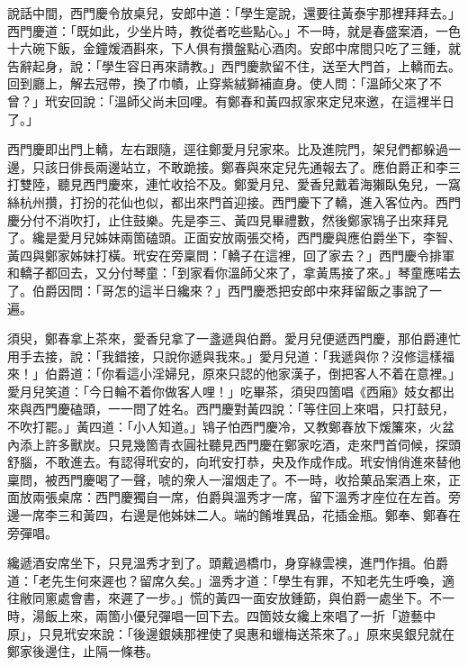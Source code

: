 說話中間，西門慶令放桌兒，安郎中道：「學生寔說，還要往黃泰宇那裡拜拜去。」西門慶道：「既如此，少坐片時，教從者吃些點心。」不一時，就是春盛案酒，一色十六碗下飯，金鐘煖酒斟來，下人俱有攢盤點心酒肉。安郎中席間只吃了三鍾，就告辭起身，說：「學生容日再來請教。」西門慶款留不住，送至大門首，上轎而去。回到廳上，解去冠帶，換了巾幘，止穿紫絨獅補直身。使人問：「溫師父來了不曾？」玳安回說：「溫師父尚未回哩。有鄭春和黃四叔家來定兒來邀，在這裡半日了。」

西門慶即出門上轎，左右跟隨，逕往鄭愛月兒家來。比及進院門，架兒們都躲過一邊，只該日俳長兩邊站立，不敢跪接。{}鄭春與來定兒先通報去了。應伯爵正和李三打雙陸，聽見西門慶來，連忙收拾不及。鄭愛月兒、愛香兒戴着海獺臥兔兒，一窩絲杭州攢，打扮的花仙也似，都出來門首迎接。西門慶下了轎，進入客位內。西門慶分付不消吹打，{}止住鼓樂。先是李三、黃四見畢禮數，然後鄭家鴇子出來拜見了。纔是愛月兒姊妹兩箇磕頭。正面安放兩張交椅，西門慶與應伯爵坐下，李智、黃四與鄭家姊妹打橫。玳安在旁稟問：「轎子在這裡，回了家去？」西門慶令排軍和轎子都回去，又分付琴童：「到家看你溫師父來了，拿黃馬接了來。」琴童應喏去了。伯爵因問：「哥怎的這半日纔來？」西門慶悉把安郎中來拜留飯之事說了一遍。

須臾，鄭春拿上茶來，愛香兒拿了一盞遞與伯爵。愛月兒便遞西門慶，那伯爵連忙用手去接，說：「我錯接，只說你遞與我來。」愛月兒道：「我遞與你？沒修這樣福來！」伯爵道：「你看這小淫婦兒，原來只認的他家漢子，倒把客人不着在意裡。」{}愛月兒笑道：「今日輪不着你做客人哩！」吃畢茶，須臾四箇唱《西廂》妓女都出來與西門慶磕頭，一一問了姓名。西門慶對黃四說：「等住回上來唱，只打鼓兒，不吹打罷。」黃四道：「小人知道。」鴇子怕西門慶冷，又教鄭春放下煖簾來，火盆內添上許多獸炭。只見幾箇青衣圓社聽見西門慶在鄭家吃酒，走來門首伺候，探頭舒腦，不敢進去。有認得玳安的，向玳安打恭，央及作成作成。玳安悄俏進來替他稟問，被西門慶喝了一聲，{}唬的衆人一溜烟走了。不一時，收拾菓品案酒上來，正面放兩張桌席：西門慶獨自一席，伯爵與溫秀才一席，留下溫秀才座位在左首。旁邊一席李三和黃四，右邊是他姊妹二人。端的餚堆異品，花插金瓶。鄭奉、鄭春在旁彈唱。

纔遞酒安席坐下，只見溫秀才到了。頭戴過橋巾，身穿綠雲襖，進門作揖。伯爵道：「老先生何來遲也？留席久矣。」溫秀才道：「學生有罪，不知老先生呼喚，適往敝同窻處會書，來遲了一步。」{}{}慌的黃四一面安放鍾筯，與伯爵一處坐下。不一時，湯飯上來，兩箇小優兒彈唱一回下去。四箇妓女纔上來唱了一折「遊藝中原」，只見玳安來說：「後邊銀姨那裡使了吳惠和蠟梅送茶來了。」原來吳銀兒就在鄭家後邊住，止隔一條巷。

